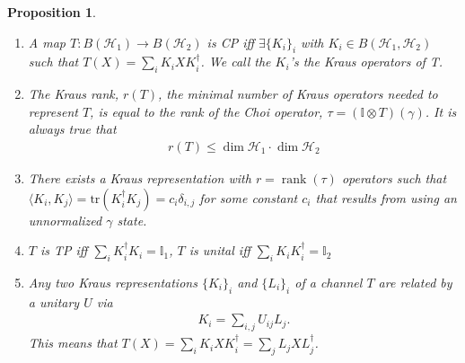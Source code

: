 \documentclass[10pt,oneside,longbibliography]{report}
\DeclareMathOperator{\rank}{rank}
\newtheorem{proposition}{Proposition}[section]
\begin{document}
\begin{proposition}
\begin{enumerate}
    \item A map $T:B(\mathcal{H}_1)\rightarrow B(\mathcal{H}_2)$ is CP iff $\exists \{K_i\}_i$ with $K_i \in B(\mathcal{H}_1,\mathcal{H}_2)$ such that $T(X) = \sum_i K_i X K_i^{\dagger}$. We call the $K_i$'s the Kraus operators of T. 
    \item The Kraus rank, $r(T)$, the minimal number of Kraus operators needed to represent $T$, is equal to the rank of the Choi operator, $\tau = (\mathbb{I}\otimes T)(\gamma)$. It is always true that 
    \begin{align}
        r(T) \leq \dim\mathcal{H}_1\cdot\dim\mathcal{H}_2
    \end{align}
    \item There exists a Kraus representation with $r=\rank(\tau)$ operators such that $\langle K_i,K_j\rangle=\text{tr}(K_i^{\dagger} K_j) = c_i \delta_{i,j}$ for some constant $c_i$ that results from using an unnormalized $\gamma$ state. 
    \item $T$ is TP iff $\sum_i K_i^{\dagger}K_i = \mathbb{I}_1$, $T$ is unital iff $\sum_i K_i K_i^{\dagger} = \mathbb{I}_2$
    \item Any two Kraus representations $\{K_i\}_i$ and $\{L_i\}_i$ of a channel $T$ are related by a unitary $U$ via 
    \begin{align}
        K_i = \sum_{i,j} U_{ij}L_j.
    \end{align}
    This means that $T(X)=\sum_i K_i X K_i^{\dagger} = \sum_j L_j X L_j^{\dagger}$.
\end{enumerate}
\end{proposition}
\end{document}
